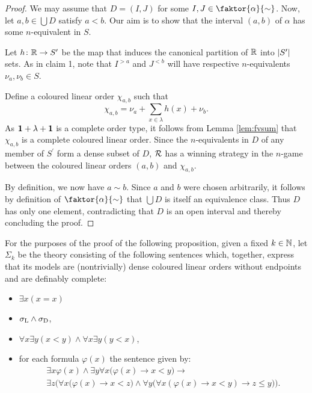 \begin{proof}
	We may assume that $D=(I,J)$ for some $I,J\in\faktor{\alpha}{\sim}$.  Now, let $a,b\in\bigcup D$ satisfy $a<b$.  Our aim is to show that the interval $(a,b)$ of $\alpha$ has some $n$-equivalent in $S$.

	Let $h\colon\mathbb{R}\to S^\prime$ be the map that induces the canonical partition of $\mathbb{R}$ into $\left\lvert S^\prime\right\rvert$ sets.  As in claim 1, note that $I^{>a}$ and $J^{<b}$ will have respective $n$-equivalents $\nu_a,\nu_b\in S$.

	Define a coloured linear order $\chi_{a,b}$ such that
	\begin{equation}
		\chi_{a,b}=\nu_a+\sum_{x\in\lambda}h(x)+\nu_b.
	\end{equation}
	As $\mathbf{1}+\lambda+\mathbf{1}$ is a complete order type, it follows from Lemma \ref{lem:fvsum} that $\chi_{a,b}$ is a complete coloured linear order.  Since the $n$-equivalents in $D$ of any member of $S^\prime$ form a dense subset of $D$, $\mathcal{R}$ has a winning strategy in the $n$-game between the coloured linear orders $(a,b)$ and $\chi_{a,b}$.

	By definition, we now have $a\sim b$.  Since $a$ and $b$ were chosen arbitrarily, it follows by definition of $\faktor{\alpha}{\sim}$ that $\bigcup D$ is itself an equivalence class.  Thus $D$ has only one element, contradicting that $D$ is an open interval and thereby concluding the proof.
\end{proof}

For the purposes of the proof of the following proposition, given a fixed $k\in\mathbb{N}$, let $\Sigma_k$ be the theory consisting of the following sentences which, together, express that its models are (nontrivially) dense coloured linear orders without endpoints and are definably complete:
\begin{itemize}
	\item	$\exists x(x=x)$
	\item	$\sigma_{\mathrm{L}}\wedge\sigma_{\mathrm{D}}$,
	\item	$\forall x\exists y(x<y)\wedge\forall x\exists y(y<x)$,
	\item	for each formula $\varphi(x)$ the sentence given by:
	      \begin{multline}
		      \exists x\varphi(x)\wedge\exists y\forall x\big(\varphi(x)\rightarrow x<y\big)\rightarrow\\
		      \exists z\Big(\forall x\big(\varphi (x)\rightarrow x<z\big)\wedge\forall y\big(\forall x(\varphi(x)\rightarrow x<y)\rightarrow z\leq y\big)\Big).
	      \end{multline}
\end{itemize}

